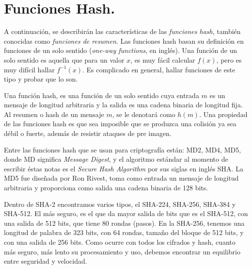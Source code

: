 \section{Funciones Hash. }
A continuación, se describirán las características de las {\it funciones hash}, también conocidas como {\it funciones de resumen}. Las funciones hash basan su definición en funciones de un solo sentido ({\it one-way functions}, en inglés). Una función de un solo sentido es aquella que para un valor $x$, es muy fácil calcular $f(x)$, pero es muy difícil hallar $f^{-1}(x)$. Es complicado en general, hallar funciones de este tipo y probar que lo son.
\begin{definition}
Una función hash, es una función de un solo sentido cuya entrada $m$ es un mensaje de longitud arbitraria y la salida es una cadena binaria de longitud fija. Al resumen o hash de un mensaje $m$, se le denotará como $h(m)$. Una propiedad de las funciones hash es que sea imposible que se produzca una colisión ya sea débil o fuerte, además de resistir ataques de pre imagen.
\end{definition}
Entre las funciones hash que se usan para criptograf\'ia est\'an: MD2, MD4, MD5, donde MD significa {\it Message Digest}, y el algoritmo est\'andar al momento de escribir \'estas notas es el {\it Secure Hash Algorithm} por sus siglas en ingl\'es SHA.
La MD5 fue dise\~nada por Ron Rivest, toma como entrada un mensaje de longitud arbitraria y proporciona como salida una cadena binaria de 128 bits.

Dentro de SHA-2 encontramos varios tipos, el SHA-224, SHA-256, SHA-384 y SHA-512. El más seguro, es el que da mayor salida de bits que es el SHA-512, con una salida de 512 bits, que tiene 80 rondas (pasos).
En la SHA-256, tenemos una longitud de palabra de 323 bits, con 64 rondas, tamaño del bloque de 512 bits, y con una salida de 256 bits.
Como ocurre con todos los cifrados y hash, cuanto más seguro, más lento su procesamiento y uso, debemos encontrar un equilibrio entre seguridad y velocidad.

